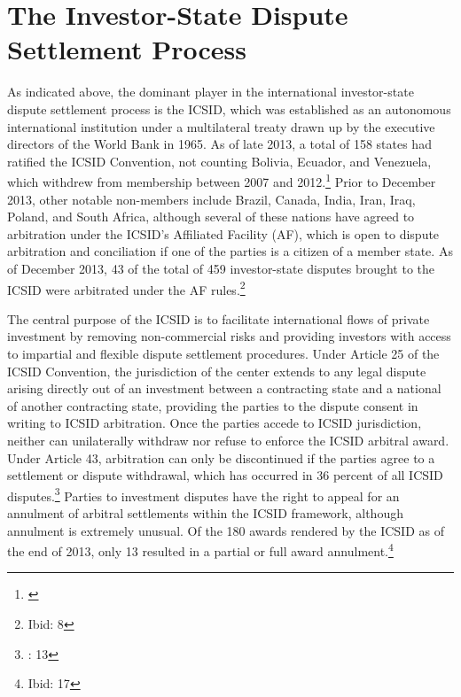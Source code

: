 \documentclass[12pt,onesided]{amsart}
\begin{document}
\section*{The Investor-State Dispute Settlement Process}

As indicated above, the dominant player in the international investor-state dispute settlement process is the ICSID, which was established as an autonomous international institution under a multilateral treaty drawn up by the executive directors of the World Bank in 1965. As of late 2013, a total of 158 states had ratified the ICSID Convention, not counting Bolivia, Ecuador, and Venezuela, which withdrew from membership between 2007 and 2012.\footnote{\citet{icsid:2014b}}  Prior to December 2013, other notable non-members include Brazil, Canada, India, Iran, Iraq, Poland, and South Africa, although several of these nations have agreed to arbitration under the ICSID's Affiliated Facility (AF), which is open to dispute arbitration and conciliation if one of the parties is a citizen of a member state. As of December 2013, 43 of the total of 459 investor-state disputes brought to the ICSID were arbitrated under the AF rules.\footnote{Ibid: 8}

The central purpose of the ICSID is to facilitate international flows of private investment by removing non-commercial risks and providing investors with access to impartial and flexible dispute settlement procedures. Under Article 25 of the ICSID Convention, the jurisdiction of the center extends to any legal dispute arising directly out of an investment between a contracting state and a national of another contracting state, providing the parties to the dispute consent in writing to ICSID arbitration. Once the parties accede to ICSID jurisdiction, neither can unilaterally withdraw nor refuse to enforce the ICSID arbitral award. Under Article 43, arbitration can only be discontinued if the parties agree to a settlement or dispute withdrawal, which has occurred in 36 percent of all ICSID disputes.\footnote{\citet{icsid:2014}: 13} Parties to investment disputes have the right to appeal for an annulment of arbitral settlements within the ICSID framework, although annulment is extremely unusual. Of the 180 awards rendered by the ICSID as of the end of 2013, only 13 resulted in a partial or full award annulment.\footnote{Ibid: 17}
\end{document}
